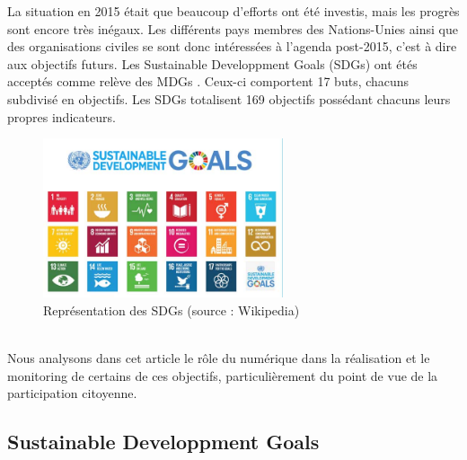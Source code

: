 \documentclass[10pt, conference, compsocconf]{llncs}
\begin{document}
	La situation en 2015 était que beaucoup d'efforts ont été investis, mais les progrès sont encore très inégaux. Les différents pays membres des Nations-Unies ainsi que des organisations civiles se sont donc intéressées à l'agenda post-2015, c'est à dire aux objectifs futurs. Les Sustainable Developpment Goals (SDGs) ont étés acceptés comme relève des MDGs \cite{wikipedia_sustainable_2017}. Ceux-ci comportent 17 buts, chacuns subdivisé en objectifs. Les SDGs totalisent 169 objectifs possédant chacuns leurs propres indicateurs.
	\begin{figure}
		\begin{center}
			\includegraphics[width=200pt]{sdgs.jpg}
		\end{center}
		\caption{Représentation des SDGs (source : Wikipedia)}
	\end{figure}
	\\
	Nous analysons dans cet article le rôle du numérique dans la réalisation et le monitoring de certains de ces objectifs, particulièrement du point de vue de la participation citoyenne.

	\subsection{Sustainable Developpment Goals}
\end{document}
